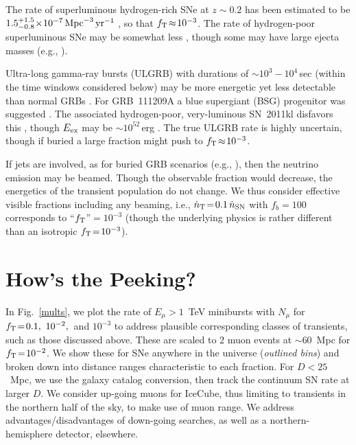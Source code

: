\documentclass[aps,prd,nofootinbib,twocolumn,floatfix,letterpaper,superscriptaddress,showpacs]{revtex4}
\begin{document}
The rate of superluminous hydrogen-rich SNe at $z \!\sim\! 0.2$ has been estimated to be $1.5_{-0.8}^{+1.5}\!\times\! 10^{-7}\, {\rm Mpc}^{-3}\, {\rm yr}^{-1}$ \cite{Quimby:2013jb}, so that $f_{\rm T} \!\approx\! 10^{-3}$.
The rate of hydrogen-poor superluminous SNe may be somewhat less \cite{Quimby:2013jb}, though some may have large ejecta masses (e.g., \cite{Nicholl:2015aqa}).

Ultra-long gamma-ray bursts (ULGRB) with durations of $\sim\! 10^3-10^4\,$sec (within the time windows considered below) may be more energetic yet less detectable than normal GRBs \cite{Levan:2013gcz}.  For GRB~111209A a blue supergiant (BSG) progenitor was suggested \cite{Gendre:2012wj}.  The associated hydrogen-poor, very-luminous SN~2011kl disfavors this \cite{Greiner:2015lia}, though $E_{\rm ex}$ may be $\sim\!10^{52}\,$erg \cite{Greiner:2015lia}.
The true ULGRB rate is highly uncertain, though if buried \cite{Murase2013b} a large fraction might push to $f_{\rm T} \!\approx\! 10^{-3}$.

If jets are involved, as for buried GRB scenarios (e.g., \cite{Meszaros:2001ms,Razzaque2004,Ando2005,Horiuchi2008,Enberg:2008jm,Bhattacharya:2014sta,Tamborra:2015fzv}), then the neutrino emission may be beamed.  Though the observable fraction would decrease, the energetics of the transient population do not change.  We thus consider effective visible fractions including any beaming, i.e., $\dot{n}_{\rm T} \!=\! 0.1\, \dot{n}_{\rm SN}$ with $f_b \!=\! 100$ corresponds to ``$f_{\rm T}$''$=\! 10^{-3}$ (though the underlying physics is rather different than an isotropic $f_{\rm T} \!=\! 10^{-3}$).



\section{How's the Peeking?}
%
In Fig.~\ref{mults}, we plot the rate of $E_\mu \!>\! 1$~TeV minibursts with $N_\mu$ for $f_{\rm T} \!=\! 0.1,~10^{-2},$~and $10^{-3}$ to address plausible corresponding classes of transients, such as those discussed above.  These are scaled to 2 muon events at $\sim\!60$~Mpc for $f_{\rm T} \!=\! 10^{-2}$.
We show these for SNe anywhere in the universe ({\it outlined bins}) and broken down into distance ranges characteristic to each fraction.  For $D \!<\! 25$~Mpc, we use the galaxy catalog conversion, then track the continuum SN rate at larger $D$.
We consider up-going muons for IceCube, thus limiting to transients in the northern half of the sky, to make use of muon range.  We address advantages/disadvantages of down-going searches, as well as a northern-hemisphere detector, elsewhere.
\end{document}
